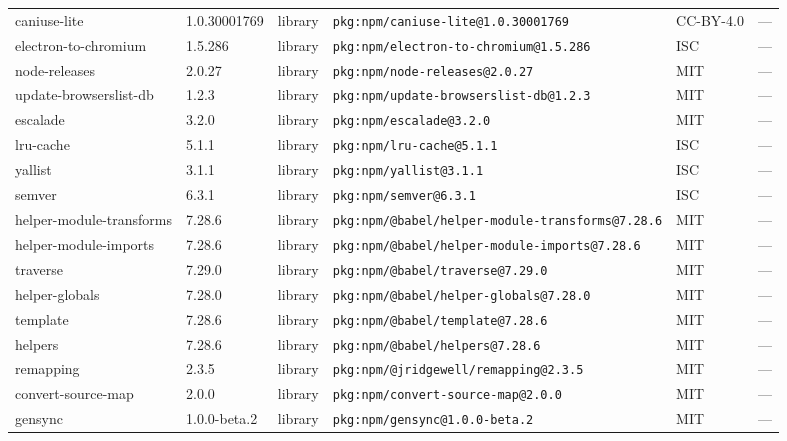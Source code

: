 \documentclass[11pt,a4paper]{article}
\begin{document}
\begin{longtable}{|p{4cm}|p{2cm}|p{1.6cm}|p{5cm}|p{1.5cm}|p{3.5cm}|}
\raggedright caniuse-lite & 1.0.30001769 & library & \small\texttt{pkg:npm/caniuse-lite@1.0.30001769} & CC-BY-4.0 & \small — \\
\raggedright electron-to-chromium & 1.5.286 & library & \small\texttt{pkg:npm/electron-to-chromium@1.5.286} & ISC & \small — \\
\raggedright node-releases & 2.0.27 & library & \small\texttt{pkg:npm/node-releases@2.0.27} & MIT & \small — \\
\raggedright update-browserslist-db & 1.2.3 & library & \small\texttt{pkg:npm/update-browserslist-db@1.2.3} & MIT & \small — \\
\raggedright escalade & 3.2.0 & library & \small\texttt{pkg:npm/escalade@3.2.0} & MIT & \small — \\
\raggedright lru-cache & 5.1.1 & library & \small\texttt{pkg:npm/lru-cache@5.1.1} & ISC & \small — \\
\raggedright yallist & 3.1.1 & library & \small\texttt{pkg:npm/yallist@3.1.1} & ISC & \small — \\
\raggedright semver & 6.3.1 & library & \small\texttt{pkg:npm/semver@6.3.1} & ISC & \small — \\
\raggedright helper-module-transforms & 7.28.6 & library & \small\texttt{pkg:npm/@babel/helper-module-transforms@7.28.6} & MIT & \small — \\
\raggedright helper-module-imports & 7.28.6 & library & \small\texttt{pkg:npm/@babel/helper-module-imports@7.28.6} & MIT & \small — \\
\raggedright traverse & 7.29.0 & library & \small\texttt{pkg:npm/@babel/traverse@7.29.0} & MIT & \small — \\
\raggedright helper-globals & 7.28.0 & library & \small\texttt{pkg:npm/@babel/helper-globals@7.28.0} & MIT & \small — \\
\raggedright template & 7.28.6 & library & \small\texttt{pkg:npm/@babel/template@7.28.6} & MIT & \small — \\
\raggedright helpers & 7.28.6 & library & \small\texttt{pkg:npm/@babel/helpers@7.28.6} & MIT & \small — \\
\raggedright remapping & 2.3.5 & library & \small\texttt{pkg:npm/@jridgewell/remapping@2.3.5} & MIT & \small — \\
\raggedright convert-source-map & 2.0.0 & library & \small\texttt{pkg:npm/convert-source-map@2.0.0} & MIT & \small — \\
\raggedright gensync & 1.0.0-beta.2 & library & \small\texttt{pkg:npm/gensync@1.0.0-beta.2} & MIT & \small — \\

\end{longtable}
\end{document}
